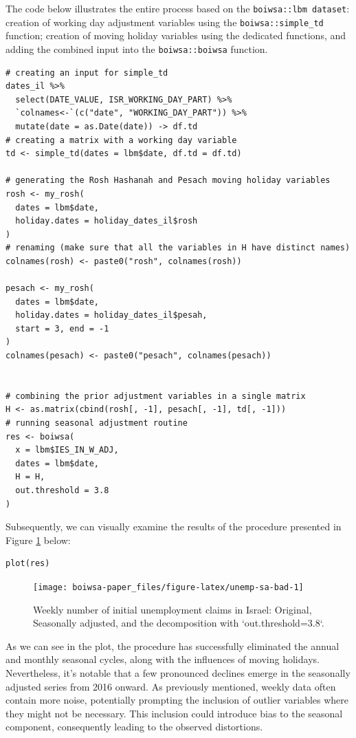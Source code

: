 The code below illustrates the entire process based on the \texttt{boiwsa::lbm\ dataset}: creation of working day adjustment variables using the \texttt{boiwsa::simple\_td} function; creation of moving holiday variables using the dedicated functions, and adding the combined input into the \texttt{boiwsa::boiwsa} function.

\begin{verbatim}
# creating an input for simple_td 
dates_il %>%
  select(DATE_VALUE, ISR_WORKING_DAY_PART) %>%
  `colnames<-`(c("date", "WORKING_DAY_PART")) %>%
  mutate(date = as.Date(date)) -> df.td
# creating a matrix with a working day variable
td <- simple_td(dates = lbm$date, df.td = df.td)

# generating the Rosh Hashanah and Pesach moving holiday variables
rosh <- my_rosh(
  dates = lbm$date,
  holiday.dates = holiday_dates_il$rosh
)
# renaming (make sure that all the variables in H have distinct names)
colnames(rosh) <- paste0("rosh", colnames(rosh))

pesach <- my_rosh(
  dates = lbm$date,
  holiday.dates = holiday_dates_il$pesah,
  start = 3, end = -1
)
colnames(pesach) <- paste0("pesach", colnames(pesach))


# combining the prior adjustment variables in a single matrix
H <- as.matrix(cbind(rosh[, -1], pesach[, -1], td[, -1]))
# running seasonal adjustment routine
res <- boiwsa(
  x = lbm$IES_IN_W_ADJ,
  dates = lbm$date,
  H = H,
  out.threshold = 3.8
)
\end{verbatim}

Subsequently, we can visually examine the results of the procedure presented in Figure \ref{fig:unemp-sa-bad} below:

\begin{verbatim}
plot(res)
\end{verbatim}

\begin{figure}[H]

{\centering \texttt{[image: boiwsa-paper\_files/figure-latex/unemp-sa-bad-1]} 

}

\caption{Weekly number of initial unemployment claims in Israel: Original, Seasonally adjusted, and the decomposition with `out.threshold=3.8`.}\label{fig:unemp-sa-bad}
\end{figure}

As we can see in the plot, the procedure has successfully eliminated the annual and monthly seasonal cycles, along with the influences of moving holidays. Nevertheless, it's notable that a few pronounced declines emerge in the seasonally adjusted series from 2016 onward. As previously mentioned, weekly data often contain more noise, potentially prompting the inclusion of outlier variables where they might not be necessary. This inclusion could introduce bias to the seasonal component, consequently leading to the observed distortions.


